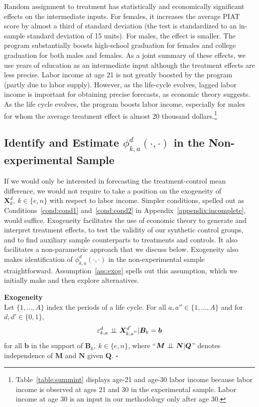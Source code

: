 \noindent Random assignment to treatment has statistically and economically significant effects on the intermediate inputs. For females, it increases the average PIAT score by almost a third of standard deviation (the test is standardized to an in-sample standard deviation of 15 units). For males, the effect is smaller. The program substantially boosts high-school graduation for females and college graduation for both males and females. As a joint summary of these effects, we use years of education as an intermediate input although the treatment effects are less precise. Labor income at age 21 is not greatly boosted by the program (partly due to labor supply). However, as the life-cycle evolves, lagged labor income is important for obtaining precise forecasts, as economic theory suggests. As the life cycle evolves, the program boosts labor income, especially for males for whom the average treatment effect is almost 20 thousand dollars.\footnote{Table~\ref{table:summint} displays age-21 and age-30 labor income because labor income is observed at ages 21 and 30 in the experimental sample. Labor income at age 30 is an input in our methodology only after age 30.}

\subsection{Identify and Estimate $\phi^d_{k,a}\left( \cdot, \cdot \right)$ in the Non-experimental Sample}

If we would only be interested in forecasting the treatment-control mean difference, we would not require to take a position on the exogeneity of $\bm{X}^d_k, \: k \in \{e,n\}$ with respect to labor income. Simpler conditions, spelled out as Conditions~\ref{cond:cond1} and~\ref{cond:cond2} in Appendix~\ref{appendix:incomplete}, would suffice. Exogeneity facilitates the use of economic theory to generate and interpret treatment effects, to test the validity of our synthetic control groups, and to find auxiliary sample counterparts to treatments and controls. It also facilitates a non-parametric approach that we discuss below. Exogeneity also makes identification of $\phi^d_{k,a}\left( \cdot, \cdot \right)$ in the non-experimental sample straightforward. Assumption~\ref{ass:exog} spells out this assumption, which we initially make and then explore alternatives.

\begin{assumption}\label{ass:exog} \textbf{Exogeneity}\\
Let $\{ 1, \ldots, A \}$ index the periods of a life cycle. For all $a, a'' \in \{ 1, \ldots, A \}$ and for $d, d' \in \{0,1\}$,
\begin{equation}
\varepsilon^d_{k,a} \perp\!\!\!\perp \bm{X}^{d^{\prime}}_{k,a^{''}} | \bm{B}_k = \bm{b}
\end{equation}
for all $\bm{b}$ in the support of $\bm{B}_k, \: k \in \{e,n\}$, where ``$\bm{M} \perp\!\!\!\perp \bm{N}|\bm{Q}$'' denotes independence of $\bm{M}$ and $\bm{N}$ given $\bm{Q}$. $\square$
\end{assumption}

